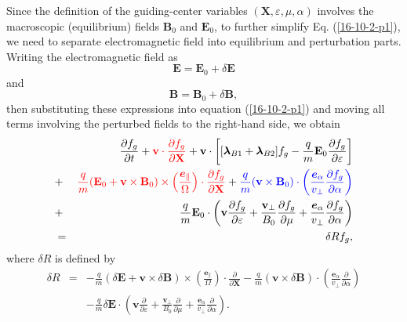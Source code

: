 \documentclass{llncs}
\newcommand{\tmcolor}[2]{{\color{#1}{#2}}}
\newcommand{\tmmathbf}[1]{\ensuremath{\boldsymbol{#1}}}
\begin{document}
Since the definition of the guiding-center variables $(\mathbf{X},
\varepsilon, \mu, \alpha)$ involves the macroscopic (equilibrium) fields
$\mathbf{B}_0$ and $\mathbf{E}_0$, to further simplify Eq. (\ref{16-10-2-p1}),
we need to separate electromagnetic field into equilibrium and perturbation
parts. Writing the electromagnetic field as
\begin{equation}
  \label{16-10-27-1} \mathbf{E}=\mathbf{E}_0 + \delta \mathbf{E}
\end{equation}
and
\begin{equation}
  \label{16-10-27-2} \mathbf{B}=\mathbf{B}_0 + \delta \mathbf{B},
\end{equation}
then substituting these expressions into equation (\ref{16-10-2-p1}) and
moving all terms involving the perturbed fields to the right-hand side, we
obtain
\begin{eqnarray}
  &  & \frac{\partial f_g}{\partial t} + \tmcolor{red}{\mathbf{v} \cdot
  \frac{\partial f_g}{\partial \mathbf{X}}} +\mathbf{v} \cdot \left[
  [\tmmathbf{\lambda}_{B 1} +\tmmathbf{\lambda}_{B 2}] f_g - \frac{q}{m}
  \mathbf{E}_0 \frac{\partial f_g}{\partial \varepsilon} \right] \nonumber\\
  & + & \tmcolor{red}{\frac{q}{m} (\mathbf{E}_0 +\mathbf{v} \times
  \mathbf{B}_0) \times \left( \frac{\tmmathbf{e}_{\parallel}}{\Omega}  \right)
  \cdot \frac{\partial f_g}{\partial \mathbf{X}}} + \tmcolor{blue}{\frac{q}{m}
  (\mathbf{v} \times \mathbf{B}_0) \cdot \left(
  \frac{\tmmathbf{e}_{\alpha}}{v_{\perp}}  \frac{\partial f_g}{\partial
  \alpha} \right)} \nonumber\\
  & + & \frac{q}{m} \mathbf{E}_0 \cdot \left( \mathbf{v} \frac{\partial
  f_g}{\partial \varepsilon} + \frac{\mathbf{v}_{\perp}}{B_0}  \frac{\partial
  f_g}{\partial \mu} + \frac{\tmmathbf{e}_{\alpha}}{v_{\perp}}  \frac{\partial
  f_g}{\partial \alpha} \right) \nonumber\\
  & = & \delta R f_g,  \label{16-10-2-p2}
\end{eqnarray}
where $\delta R$ is defined by
\begin{eqnarray}
  \delta R & = & - \frac{q}{m} (\delta \mathbf{E}+\mathbf{v} \times \delta
  \mathbf{B}) \times \left( \frac{\tmmathbf{e}_{\parallel}}{\Omega}  \right)
  \cdot \frac{\partial}{\partial \mathbf{X}} - \frac{q}{m} (\mathbf{v} \times
  \delta \mathbf{B}) \cdot \left( \frac{\tmmathbf{e}_{\alpha}}{v_{\perp}} 
  \frac{\partial}{\partial \alpha} \right) \nonumber\\
  &  & - \frac{q}{m} \delta \mathbf{E} \cdot \left( \mathbf{v}
  \frac{\partial}{\partial \varepsilon} + \frac{\mathbf{v}_{\perp}}{B_0} 
  \frac{\partial}{\partial \mu} + \frac{\tmmathbf{e}_{\alpha}}{v_{\perp}} 
  \frac{\partial}{\partial \alpha} \right) .  \label{16-10-6-1}
\end{eqnarray}
\end{document}
